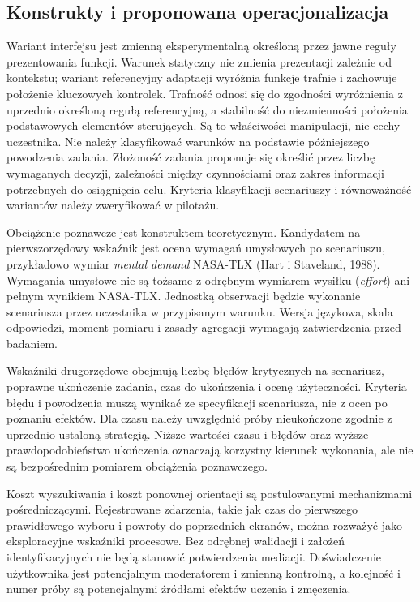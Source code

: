 \documentclass[11pt,a4paper]{article}
\begin{document}
\subsection{Konstrukty i proponowana operacjonalizacja}

Wariant interfejsu jest zmienną eksperymentalną określoną przez jawne reguły prezentowania funkcji. Warunek statyczny nie zmienia prezentacji zależnie od kontekstu; wariant referencyjny adaptacji wyróżnia funkcje trafnie i zachowuje położenie kluczowych kontrolek. Trafność odnosi się do zgodności wyróżnienia z uprzednio określoną regułą referencyjną, a stabilność do niezmienności położenia podstawowych elementów sterujących. Są to właściwości manipulacji, nie cechy uczestnika. Nie należy klasyfikować warunków na podstawie późniejszego powodzenia zadania. Złożoność zadania proponuje się określić przez liczbę wymaganych decyzji, zależności między czynnościami oraz zakres informacji potrzebnych do osiągnięcia celu. Kryteria klasyfikacji scenariuszy i równoważność wariantów należy zweryfikować w pilotażu.

Obciążenie poznawcze jest konstruktem teoretycznym. Kandydatem na pierwszorzędowy wskaźnik jest ocena wymagań umysłowych po scenariuszu, przykładowo wymiar \textit{mental demand} NASA-TLX (Hart i Staveland, 1988). Wymagania umysłowe nie są tożsame z odrębnym wymiarem wysiłku (\textit{effort}) ani pełnym wynikiem NASA-TLX. Jednostką obserwacji będzie wykonanie scenariusza przez uczestnika w przypisanym warunku. Wersja językowa, skala odpowiedzi, moment pomiaru i zasady agregacji wymagają zatwierdzenia przed badaniem.

Wskaźniki drugorzędowe obejmują liczbę błędów krytycznych na scenariusz, poprawne ukończenie zadania, czas do ukończenia i ocenę użyteczności. Kryteria błędu i powodzenia muszą wynikać ze specyfikacji scenariusza, nie z ocen po poznaniu efektów. Dla czasu należy uwzględnić próby nieukończone zgodnie z uprzednio ustaloną strategią. Niższe wartości czasu i błędów oraz wyższe prawdopodobieństwo ukończenia oznaczają korzystny kierunek wykonania, ale nie są bezpośrednim pomiarem obciążenia poznawczego.

Koszt wyszukiwania i koszt ponownej orientacji są postulowanymi mechanizmami pośredniczącymi. Rejestrowane zdarzenia, takie jak czas do pierwszego prawidłowego wyboru i powroty do poprzednich ekranów, można rozważyć jako eksploracyjne wskaźniki procesowe. Bez odrębnej walidacji i założeń identyfikacyjnych nie będą stanowić potwierdzenia mediacji. Doświadczenie użytkownika jest potencjalnym moderatorem i zmienną kontrolną, a kolejność i numer próby są potencjalnymi źródłami efektów uczenia i zmęczenia.
\end{document}
